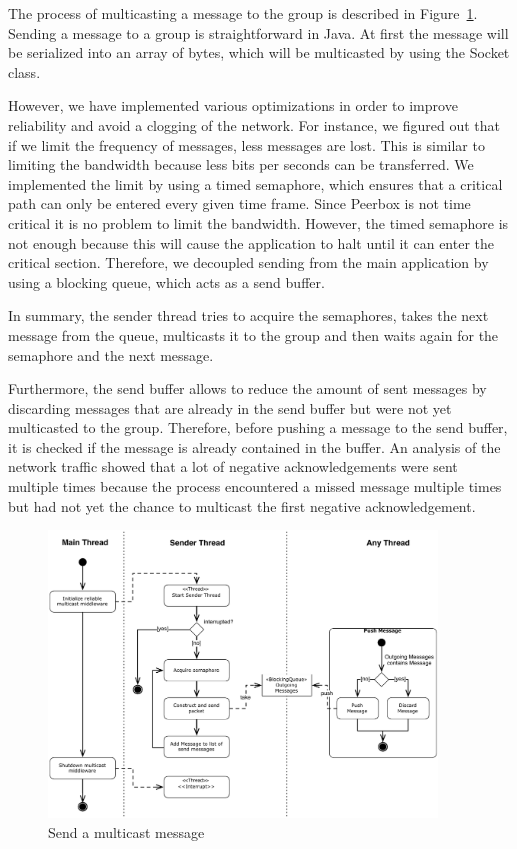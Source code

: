 The process of multicasting a message to the group is described in Figure~\ref{fig:sendMessage}. Sending a message to a group is straightforward in Java. At first the message will be serialized into an array of bytes, which will be multicasted by using the Socket class. 

However, we have implemented various optimizations in order to improve reliability and avoid a clogging of the network. For instance, we figured out that if we limit the frequency of messages, less messages are lost. This is similar to limiting the bandwidth because less bits per seconds can be transferred.  
We implemented the limit by using a timed semaphore, which ensures that a critical path can only be entered every given time frame. Since Peerbox is not time critical it is no problem to limit the bandwidth. 
However, the timed semaphore is not enough because this will cause the application to halt until it can enter the critical section. Therefore, we decoupled  sending from the main application by using a blocking queue, which acts as a send buffer. 

In summary, the sender thread tries to acquire the semaphores, takes the next message from the queue, multicasts it to the group and then waits again for the semaphore and the next message. 

Furthermore, the send buffer allows to reduce the amount of sent messages by discarding messages that are already in the send buffer but were not yet multicasted to the group. Therefore, before pushing a message to the send buffer, it is checked if the message is already contained in the buffer.
An analysis of the network traffic showed that a lot of negative acknowledgements were sent multiple times because the process encountered a missed message multiple times but had not yet the chance to multicast the first negative acknowledgement. 

\begin{figure}[htbp]
    \centering
        \includegraphics[height=3in]{figures/sendMessage.pdf}
    \caption{Send a multicast message}
    \label{fig:sendMessage}
\end{figure}
  
